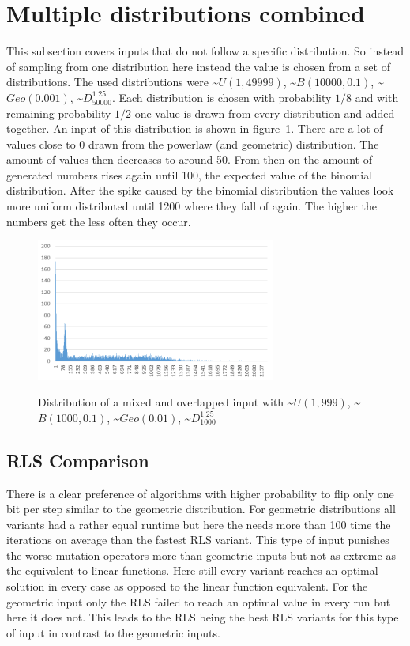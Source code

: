 \section{Multiple distributions combined}
This subsection covers inputs that do not follow a specific distribution.
So instead of sampling from one distribution here instead the value is chosen from a set of distributions.
The used distributions were \textasciitilde$U(1,49999)$, \textasciitilde$B(10000,0.1)$, \textasciitilde$Geo(0.001)$, \textasciitilde$D^{1.25}_{50000}$.
Each distribution is chosen with probability $1/8$ and with remaining probability $1/2$ one value is drawn from every distribution and added together.
An input of this distribution is shown in figure~\ref{fig:mixAndOverlDistExample}.
There are a lot of values close to 0 drawn from the powerlaw (and geometric) distribution.
The amount of values then decreases to around 50.
From then on the amount of generated numbers rises again until 100, the expected value of the binomial distribution.
After the spike caused by the binomial distribution the values look more uniform distributed until 1200 where they fall of again.
The higher the numbers get the less often they occur.

\begin{figure}[h]
      \caption{Distribution of a mixed and overlapped input with \textasciitilde$U(1,999)$, \textasciitilde$B(1000,0.1)$, \textasciitilde$Geo(0.01)$, \textasciitilde$D^{1.25}_{1000}$}
      \centering
      \includegraphics[width=0.7\textwidth]{figures/images/numberGenerator/mixedAndOverlapped.png}\label{fig:mixAndOverlDistExample}
\end{figure}

\subsection{RLS Comparison}


There is a clear preference of algorithms with higher probability to flip only one bit per step similar to the geometric distribution.
For geometric distributions all variants had a rather equal runtime but here the \RLSN[4] needs more than 100 time the iterations on average than the fastest RLS variant.
This type of input punishes the worse mutation operators more than geometric inputs but not as extreme as the equivalent to linear functions.
Here still every variant reaches an optimal solution in every case as opposed to the linear function equivalent.
For the geometric input only the RLS failed to reach an optimal value in every run but here it does not.
This leads to the RLS being the best RLS variants for this type of input in contrast to the geometric inputs.
